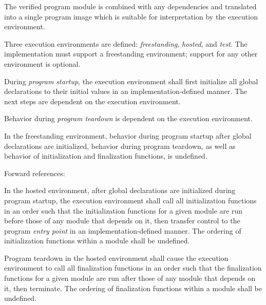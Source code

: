 
\specsubitem
The verified program module is combined with any dependencies and translated
into a single program image which is suitable for interpretation by the
execution environment.


\specsubitem
Three execution environments are defined: \textit{freestanding},
\textit{hosted}, and \textit{test}. The implementation must support a
freestanding environment; support for any other environment is optional.

\specsubitem
During \textit{program startup}, the execution environment shall first
initialize all global declarations to their initial values in an
implementation-defined manner. The next steps are dependent on the execution
environment.

\specsubitem
Behavior during \textit{program teardown} is dependent on the execution
environment.


\specsubsubitem
In the freestanding environment, behavior during program startup after global
declarations are initialized, behavior during program teardown, as well as
behavior of initialization and finalization functions, is undefined.

Forward references: 


\specsubsubitem
In the hosted environment, after global declarations are initialized during
program startup, the execution environment shall call all initialization
functions in an order such that the initialization functions for a given
module are run before those of any module that depends on it, then transfer
control to the program \textit{entry point} in an implementation-defined manner.
The ordering of initialization functions within a module shall be undefined.

\specsubsubitem
Program teardown in the hosted environment shall cause the execution environment
to call all finalization functions in an order such that the finalization
functions for a given module are run after those of any module that depends on
it, then terminate. The ordering of finalization functions within a module shall
be undefined.

